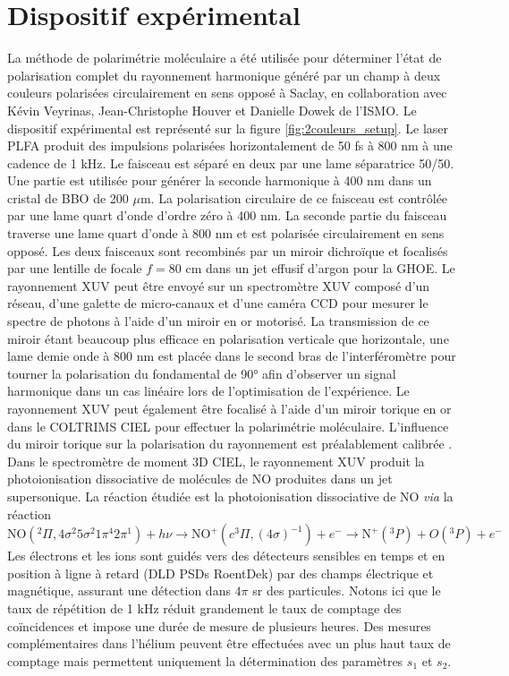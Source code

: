 \section{Dispositif expérimental}
La méthode de polarimétrie moléculaire a été utilisée pour déterminer l'état de polarisation complet du rayonnement harmonique généré par un champ à deux couleurs polarisées circulairement en sens opposé à Saclay, en collaboration avec Kévin Veyrinas, Jean-Christophe Houver et Danielle Dowek de l'ISMO. Le dispositif expérimental est représenté sur la figure \ref{fig:2couleurs_setup}. Le laser PLFA  produit des impulsions polarisées horizontalement de 50 fs à 800 nm à une cadence de 1 kHz. Le faisceau est séparé en deux par une lame séparatrice 50/50. Une partie est utilisée pour générer la seconde harmonique à 400 nm dans un cristal de BBO de 200 $\mu$m. La polarisation circulaire de ce faisceau est contrôlée par une lame quart d'onde d'ordre zéro à 400 nm. La seconde partie du faisceau traverse une lame quart d'onde à 800 nm et est polarisée circulairement en sens opposé. Les deux faisceaux sont recombinés par un miroir dichroïque et focalisés par une lentille de focale $f = 80$ cm dans un jet effusif d'argon pour la GHOE. Le rayonnement XUV peut être envoyé sur un spectromètre XUV composé d'un réseau, d'une galette de micro-canaux et d'une caméra CCD pour mesurer le spectre de photons à l'aide d'un miroir en or motorisé. La transmission de ce miroir étant beaucoup plus efficace en polarisation verticale que horizontale, une lame demie onde à 800 nm est placée dans le second bras de l'interféromètre pour tourner la polarisation du fondamental de 90° afin d'observer un signal harmonique dans un cas linéaire lors de l'optimisation de l'expérience. Le rayonnement XUV peut également être focalisé à l'aide d'un miroir torique en or dans le COLTRIMS CIEL  pour effectuer la polarimétrie moléculaire. L'influence du miroir torique sur la polarisation du rayonnement est préalablement calibrée . Dans le spectromètre de moment 3D CIEL, le rayonnement XUV produit la photoionisation dissociative de molécules de NO produites dans un jet supersonique. La réaction étudiée est la photoionisation dissociative de NO \textit{via} la réaction
\begin{equation}
\text{NO}(^2\Pi,4\sigma^2 5\sigma^2 1\pi^4 2\pi^1) + h\nu \longrightarrow \text{NO}^+ (c ^3\Pi, (4\sigma)^{-1}) + e^- \longrightarrow \text{N}^+ (^3P) + O (^3P) + e^-
\end{equation}
Les électrons et les ions sont guidés vers des détecteurs sensibles en temps et en position à ligne à retard (DLD PSDs RoentDek) par des champs électrique et magnétique, assurant une détection dans $4\pi$ sr des particules. Notons ici que le taux de répétition de 1 kHz réduit grandement le taux de comptage des coïncidences et impose une durée de mesure de plusieurs heures. Des mesures complémentaires dans l'hélium peuvent être effectuées avec un plus haut taux de comptage mais permettent uniquement la détermination des paramètres $s_1$ et $s_2$.

